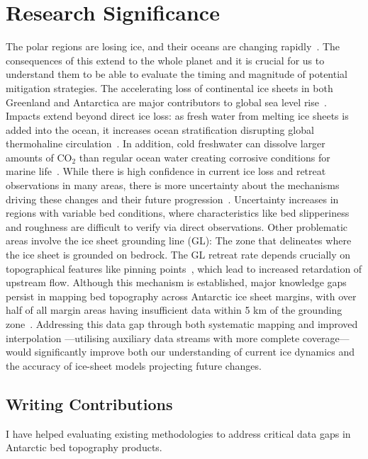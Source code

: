 \chapter{Research Significance}
The polar regions are losing ice, and their oceans are changing rapidly~\cite{O_C_in_changingClimate}. The consequences of this extend to the whole planet and it is crucial for us to understand them to be able to evaluate the timing and magnitude of potential mitigation strategies. 
The accelerating loss of continental ice sheets in both Greenland and Antarctica are major contributors to global sea level rise~\cite{O_C_in_changingClimate}. Impacts extend beyond direct ice loss: as fresh water from melting ice sheets is added into the ocean, it increases ocean stratification disrupting global thermohaline circulation~\cite{Jacobs_2004}. In addition, cold freshwater can dissolve larger amounts of $\mathrm{CO_2}$ than regular ocean water creating corrosive conditions for marine life~\cite{O_C_in_changingClimate}.
While there is high confidence in current ice loss and retreat observations in many areas, there is more uncertainty about the mechanisms driving these changes and their future progression~\cite{Fox-Kemper_2021}. Uncertainty increases in regions with variable bed conditions, where characteristics like bed slipperiness and roughness are difficult to verify via direct observations. Other problematic areas involve the ice sheet grounding line (GL): The zone that delineates where the ice sheet is grounded on bedrock. The GL retreat rate depends crucially on topographical features like pinning points~\cite{Fox-Kemper_2021}, which lead to increased retardation of upstream flow. Although this mechanism is established, major knowledge gaps persist in mapping bed topography across Antarctic ice sheet margins, with over half of all margin areas having insufficient data within 5 km of the grounding zone~\cite{RINGS_2022}. Addressing this data gap through both systematic mapping and improved interpolation —utilising auxiliary data streams with more complete coverage— would significantly improve both our understanding of current ice dynamics and the accuracy of ice-sheet models projecting future changes.

\section{Writing Contributions}
I have helped evaluating existing methodologies to address critical data gaps in Antarctic bed topography products. 

